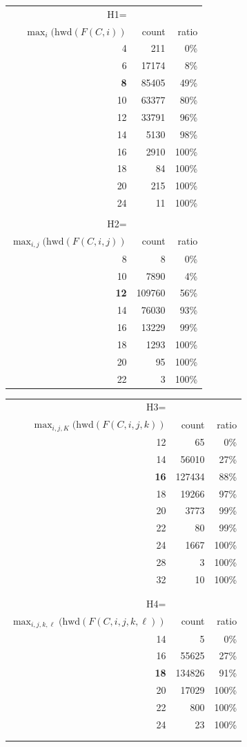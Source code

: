 \documentclass[11pt,twoside]{article}
\begin{document}
\begin{table}[htbp]
  \centering
  \begin{tabular}{rrr}
\hline
H1=\\
$\max_i(\mbox{hwd}(F(C,i))$ & count & ratio \\
\hline
  4 &    211 &   0\% \\
  6 &  17174 &   8\% \\
  \textbf{8} &  85405 &  49\% \\
 10 &  63377 &  80\% \\
 12 &  33791 &  96\% \\
 14 &   5130 &  98\% \\
 16 &   2910 & 100\% \\
 18 &     84 & 100\% \\
 20 &    215 & 100\% \\
 24 &     11 & 100\% \\
\\
\hline
H2=\\
$\max_{i,j}(\mbox{hwd}(F(C,i,j))$ & count & ratio \\
\hline
  8 &      8 &  0\%  \\
 10 &   7890 &  4\%  \\
 \textbf{12} & 109760 & 56\%  \\
 14 &  76030 & 93\%  \\
 16 &  13229 & 99\%  \\
 18 &   1293 & 100\% \\
 20 &     95 & 100\% \\
 22 &      3 & 100\% \\
  \end{tabular}
  \quad
  \begin{tabular}{rrr}
\hline
H3= \\
$\max_{i,j,K}(\mbox{hwd}(F(C,i,j,k))$ & count & ratio \\
\hline
 12 &     65 &  0\% \\
 14 &  56010 & 27\% \\
 \textbf{16} & 127434 & 88\% \\
 18 &  19266 & 97\% \\
 20 &   3773 & 99\% \\
 22 &     80 & 99\% \\
 24 &   1667 &100\% \\
 28 &      3 &100\% \\
 32 &     10 &100\% \\
\\ \\ 
\hline%
H4=\\
$\max_{i,j,k,\ell}(\mbox{hwd}(F(C,i,j,k,\ell))$ & count & ratio \\
\hline
 14 &      5 &  0\%  \\
 16 &  55625 & 27\%  \\
 \textbf{18} & 134826 & 91\%  \\
 20 &  17029 & 100\% \\
 22 &    800 & 100\% \\
 24 &     23 & 100\% \\
\\ \\     
  \end{tabular}


\end{table}
\end{document}

